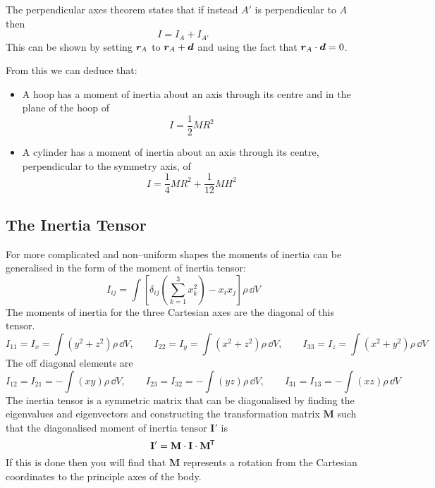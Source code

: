 \documentclass{article}
\newcommand{\mat}[1]{\mathbf{#1}}
\begin{document}
    The perpendicular axes theorem states that if instead \(A'\) is perpendicular to \(A\) then
    \[I = I_A + I_{A'}\]
    This can be shown by setting \(\bm{r}_A\) to \(\bm{r}_A + \bm{d}\) and using the fact that \(\bm{r}_A\cdot\bm{d} = 0\).
    
    From this we can deduce that:
    \begin{itemize}
        \item A hoop has a moment of inertia about an axis through its centre and in the plane of the hoop of
        \[I = \frac{1}{2}MR^2\]
        \item A cylinder has a moment of inertia about an axis through its centre, perpendicular to the symmetry axis, of
        \[I = \frac{1}{4}MR^2 + \frac{1}{12}MH^2\]
    \end{itemize}
    
    \subsection{The Inertia Tensor}
    For more complicated and non--uniform shapes the moments of inertia can be generalised in the form of the moment of inertia tensor:
    \[I_{ij} = \int\left[\delta_{ij}\left(\sum_{k=1}^3 x_k^2\right) - x_ix_j\right]\rho\,\dd V\]
    The moments of inertia for the three Cartesian axes are the diagonal of this tensor.
    \[I_{11} = I_x = \int(y^2 + z^2)\rho\,\dd V,\qquad I_{22} = I_y = \int(x^2 + z^2)\rho\,\dd V,\qquad I_{33} = I_z = \int(x^2 + y^2)\rho\,\dd V\]
    The off diagonal elements are
    \[I_{12} = I_{21} = -\int(xy)\rho\,\dd V,\qquad I_{23} = I_{32} = -\int(yz)\rho\,\dd V,\qquad I_{31} = I_{13} = -\int(xz)\rho\,\dd V\]
    The inertia tensor is a symmetric matrix that can be diagonalised by finding the eigenvalues and eigenvectors and constructing the transformation matrix \(\mat M\) such that the diagonalised moment of inertia tensor \(\mat I'\) is
    \[\mat I' = \mat M\cdot\mat I\cdot\mat M\trans\]
    If this is done then you will find that \(\mat M\) represents a rotation from the Cartesian coordinates to the principle axes of the body.
    
\end{document}
